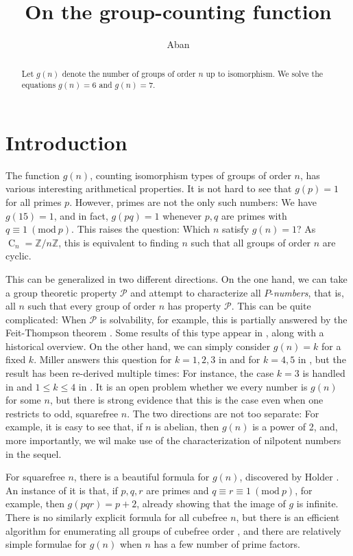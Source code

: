 \documentclass[draft]{article}
\newcommand{\cyc}[1]{\operatorname{C}_{#1}}
\newcommand{\Mod}[1]{\ (\mathrm{mod} \ #1)}
\theoremstyle{plain}
\theoremstyle{definition}
\begin{document}
\title{On the group-counting function}
\author{Aban}
\maketitle

\begin{abstract}
	Let $g(n)$ denote the number of groups of order $n$ up to isomorphism. We solve the equations $g(n) = 6$ and $g(n) = 7$.
\end{abstract}

\section{Introduction}
The function $g(n)$, counting isomorphism types of groups of order $n$, has various interesting arithmetical properties. It is not hard to see that $g(p) = 1$ for all primes $p$. However, primes are not the only such numbers: We have $g(15) = 1$, and in fact, $g(pq) = 1$ whenever $p, q$ are primes with $q \equiv 1 \Mod{p}$. This raises the question: Which $n$ satisfy $g(n) = 1$? As $\cyc{n} = \mathbb{Z}/n\mathbb{Z}$, this is equivalent to finding $n$ such that all groups of order $n$ are cyclic.

This can be generalized in two different directions. On the one hand, we can take a group theoretic property $\mathcal{P}$ and attempt to characterize all $P$-\emph{numbers}, that is, all $n$ such that every group of order $n$ has property $\mathcal{P}$. This can be quite complicated: When $\mathcal{P}$ is solvability, for example, this is partially answered by the Feit-Thompson theorem {\cite{oddsolve}}. Some results of this type appear in {{\cite{nilnumb}}}, along with a historical overview. On the other hand, we can simply consider $g(n) = k$ for a fixed $k$. Miller answers this question for $k = 1, 2, 3$ in {\cite{miller1}} and for $k = 4, 5$ in {\cite{miller2}}, but the result has been re-derived multiple times: For instance, the case $k = 3$ is handled in {\cite{olsson}} and $1 \le k \le 4$ in {\cite{gnumoas}}. It is an open problem whether we every number is $g(n)$ for some $n$, but there is strong evidence that this is the case even when one restricts to odd, squarefree $n$. The two directions are not too separate: For example, it is easy to see that, if $n$ is abelian, then $g(n)$ is a power of 2, and, more importantly, we wil make use of the characterization of nilpotent numbers in the sequel.

For squarefree $n$, there is a beautiful formula for $g(n)$, discovered by Holder {\cite{gnumoas}}. An instance of it is that, if $p, q, r$ are primes and $q \equiv r \equiv 1 \Mod{p}$, for example, then $g(pqr) = p + 2$, already showing that the image of $g$ is infinite. There is no similarly explicit formula for all cubefree $n$, but there is an efficient algorithm for enumerating all groups of cubefree order {\cite{cubefree}}, and there are relatively simple formulae for $g(n)$ when $n$ has a few number of prime factors.
\end{document}
